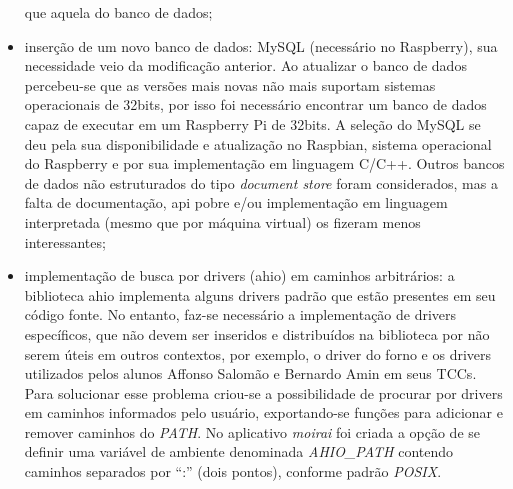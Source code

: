 \begin{itemize}
          que aquela do banco de dados;
    \item inserção de um novo banco de dados: MySQL (necessário no Raspberry),
          sua necessidade veio da modificação anterior. Ao atualizar o banco de
          dados percebeu-se que as versões mais novas não mais suportam sistemas
          operacionais de 32bits, por isso foi necessário encontrar um banco de
          dados capaz de executar em um Raspberry Pi de 32bits. A seleção do
          MySQL se deu pela sua disponibilidade e atualização no Raspbian,
          sistema operacional do Raspberry e por sua implementação em linguagem
          C/C++. Outros bancos de dados não estruturados do tipo
          \textit{document store} foram considerados, mas a falta de
          documentação, api pobre e/ou implementação em linguagem interpretada
          (mesmo que por máquina virtual) os fizeram menos interessantes;
    \item implementação de busca por drivers (ahio) em caminhos arbitrários: a
          biblioteca ahio implementa alguns drivers padrão que estão presentes
          em seu código fonte. No entanto, faz-se necessário a implementação de
          drivers específicos, que não devem ser inseridos e distribuídos na
          biblioteca por não serem úteis em outros contextos, por exemplo, o
          driver do forno e os drivers utilizados pelos alunos Affonso Salomão e
          Bernardo Amin em seus TCCs. Para solucionar esse problema criou-se a
          possibilidade de procurar por drivers em caminhos informados pelo
          usuário, exportando-se funções para adicionar e remover caminhos do
          \textit{PATH}. No aplicativo \textit{moirai} foi criada a opção de se
          definir uma variável de ambiente denominada \textit{AHIO\_PATH}
          contendo caminhos separados por \enquote{:} (dois pontos), conforme
          padrão \textit{POSIX}.
\end{itemize}
